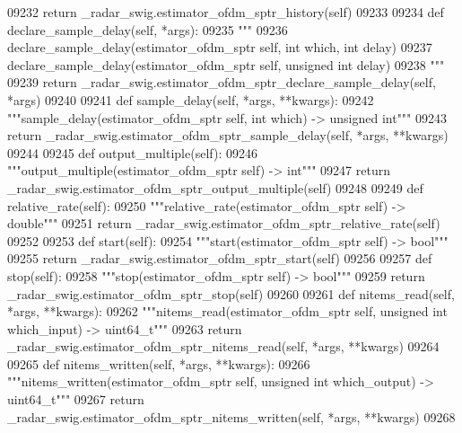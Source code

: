 \begin{DoxyCode}
{{{{{{{{{{{{{{{{{{{{{{{{{{{{{{09232         \textcolor{keywordflow}{return} \_radar\_swig.estimator\_ofdm\_sptr\_history(self)
09233 
09234     \textcolor{keyword}{def }declare_sample_delay(self, *args):
09235         \textcolor{stringliteral}{"""}
09236 \textcolor{stringliteral}{        declare\_sample\_delay(estimator\_ofdm\_sptr self, int which, int delay)}
09237 \textcolor{stringliteral}{        declare\_sample\_delay(estimator\_ofdm\_sptr self, unsigned int delay)}
09238 \textcolor{stringliteral}{        """}
09239         \textcolor{keywordflow}{return} \_radar\_swig.estimator\_ofdm\_sptr\_declare\_sample\_delay(self, *args)
09240 
09241     \textcolor{keyword}{def }sample_delay(self, *args, **kwargs):
09242         \textcolor{stringliteral}{"""sample\_delay(estimator\_ofdm\_sptr self, int which) -> unsigned int"""}
09243         \textcolor{keywordflow}{return} \_radar\_swig.estimator\_ofdm\_sptr\_sample\_delay(self, *args, **kwargs)
09244 
09245     \textcolor{keyword}{def }output_multiple(self):
09246         \textcolor{stringliteral}{"""output\_multiple(estimator\_ofdm\_sptr self) -> int"""}
09247         \textcolor{keywordflow}{return} \_radar\_swig.estimator\_ofdm\_sptr\_output\_multiple(self)
09248 
09249     \textcolor{keyword}{def }relative_rate(self):
09250         \textcolor{stringliteral}{"""relative\_rate(estimator\_ofdm\_sptr self) -> double"""}
09251         \textcolor{keywordflow}{return} \_radar\_swig.estimator\_ofdm\_sptr\_relative\_rate(self)
09252 
09253     \textcolor{keyword}{def }start(self):
09254         \textcolor{stringliteral}{"""start(estimator\_ofdm\_sptr self) -> bool"""}
09255         \textcolor{keywordflow}{return} \_radar\_swig.estimator\_ofdm\_sptr\_start(self)
09256 
09257     \textcolor{keyword}{def }stop(self):
09258         \textcolor{stringliteral}{"""stop(estimator\_ofdm\_sptr self) -> bool"""}
09259         \textcolor{keywordflow}{return} \_radar\_swig.estimator\_ofdm\_sptr\_stop(self)
09260 
09261     \textcolor{keyword}{def }nitems_read(self, *args, **kwargs):
09262         \textcolor{stringliteral}{"""nitems\_read(estimator\_ofdm\_sptr self, unsigned int which\_input) -> uint64\_t"""}
09263         \textcolor{keywordflow}{return} \_radar\_swig.estimator\_ofdm\_sptr\_nitems\_read(self, *args, **kwargs)
09264 
09265     \textcolor{keyword}{def }nitems_written(self, *args, **kwargs):
09266         \textcolor{stringliteral}{"""nitems\_written(estimator\_ofdm\_sptr self, unsigned int which\_output) -> uint64\_t"""}
09267         \textcolor{keywordflow}{return} \_radar\_swig.estimator\_ofdm\_sptr\_nitems\_written(self, *args, **kwargs)
09268 
}}}}}}}}}}}}}}}}}}}}}}}}}}}}}}
\end{DoxyCode}
